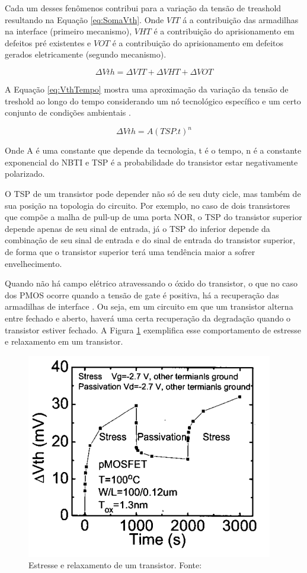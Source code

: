 Cada um desses fenômenos contribui para a variação da tensão de treashold resultando na Equação \ref{eq:SomaVth}. Onde $V\scriptstyle{IT}$ á a contribuição das armadilhas na interface (primeiro mecanismo), $V\scriptstyle{HT}$ é a contribuição do aprisionamento em defeitos pré existentes e $V\scriptstyle{OT}$ é a contribuição do aprisionamento em defeitos gerados eletricamente (segundo mecanismo).

\begin{equation}
    \label{eq:SomaVth}
    \Delta V{\scriptstyle {th}} = \Delta V{\scriptstyle {IT}} + \Delta V{\scriptstyle {HT}} + \Delta V{\scriptstyle {OT}}
\end{equation}

A Equação \ref{eq:VthTempo} mostra uma aproximação da variação da tensão de treshold ao longo do tempo considerando um nó tecnológico específico e um certo conjunto de condições ambientais \cite{Butzen}.

\begin{equation}
    \label{eq:VthTempo}
    \Delta Vth = A(TSP.t)^n
\end{equation}

Onde A é uma constante que depende da tecnologia, t é o tempo, n é a constante exponencial do NBTI e TSP é a probabilidade do transistor estar negativamente polarizado.

O TSP de um transistor pode depender não só de seu duty cicle, mas também de sua posição na topologia do circuito. Por exemplo, no caso de dois transistores que compõe a malha de pull-up de uma porta NOR, o TSP do transistor superior depende apenas de seu sinal de entrada, já o TSP do inferior depende da combinação de seu sinal de entrada e do sinal de entrada do transistor superior, de forma que o transistor superior terá uma tendência maior a sofrer envelhecimento.

Quando não há campo elétrico atravessando o óxido do transistor, o que no caso dos PMOS ocorre quando a tensão de gate é positiva, há a recuperação das armadilhas de interface \cite{Chen}. Ou seja, em um circuito em que um transistor alterna entre fechado e aberto, haverá uma certa recuperação da degradação quando o transistor estiver fechado. A Figura \ref{fig:recover} exemplifica esse comportamento de estresse e relaxamento em um transistor.

\begin{figure}[H]
    \centering
    \includegraphics[scale=0.8]{figures/ReferencialTeorico/Recover.png}
    \caption{Estresse e relaxamento de um transistor. Fonte: \cite{Chen}}
    \label{fig:recover}
\end{figure}
